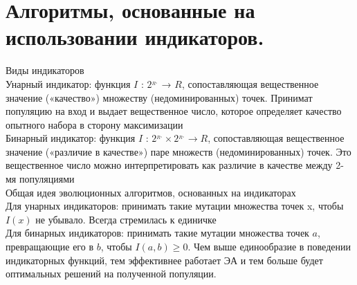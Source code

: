 \section{Алгоритмы, основанные на использовании индикаторов.}
Виды индикаторов\\
Унарный индикатор: функция $I$ : $2^_{R^_{n}}$ → $R$, сопоставляющая вещественное
значение («качество») множеству (недоминированных) точек.
Принимат популяцию на вход и выдает вещественное число, которое определяет качество опытного набора в сторону максимизации\\
Бинарный индикатор: функция $I$ : $2^_{R^_{n}} × 2^_{R^_{n}}
→ R$, сопоставляющая
вещественное значение («различие в качестве») паре множеств
(недоминированных) точек. Это вещественное число можно интерпретировать как различие в качестве между 2-мя популяциями\\
Общая идея эволюционных алгоритмов, основанных на индикаторах\\
Для унарных индикаторов: принимать такие мутации множества точек x,
чтобы $I(x)$ не убывало. Всегда стремилась к единичке\\
Для бинарных индикаторов: принимать такие мутации множества точек $a$,
превращающие его в $b$, чтобы $I(a,b) ≥ 0$. Чем выше единообразие в поведении индикаторных функций, тем эффективнее работает ЭА и тем больше будет оптимальных решений на полученной популяции.
